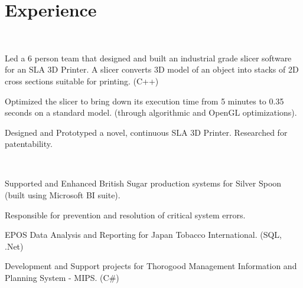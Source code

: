 \documentclass[]{deedy-resume-openfont}
\begin{document}
\hfill
\begin{minipage}[t]{0.66\textwidth} 



\section{Experience}

\\
\vspace{\topsep}
\begin{tightemize}
\item  Led a 6 person team that designed and built an industrial grade slicer software for an SLA 3D Printer. A slicer converts 3D model of an object into stacks of 2D cross sections suitable for printing. (C++)
\item Optimized the slicer to bring down its execution time from 5 minutes to 0.35 seconds on a standard model. (through algorithmic and OpenGL optimizations).
\item Designed and Prototyped a novel, continuous SLA 3D Printer. Researched for patentability.
\end{tightemize}

\sectionsep{}

\\
\vspace{\topsep} %
\begin{tightemize}
\item Supported and Enhanced British Sugar production systems for Silver Spoon (built using Microsoft BI suite).
	\item Responsible for prevention and resolution of critical system errors.  
	\item EPOS Data Analysis and Reporting for Japan Tobacco International. (SQL, .Net)
	\item Development and Support projects for Thorogood Management Information and Planning System - MIPS. (C\#)
\end{tightemize}
\sectionsep




\end{minipage}
\end{document}

